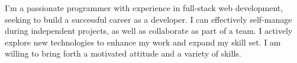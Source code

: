 

\begin{cvparagraph}

I'm a passionate programmer with experience in full-stack web development, seeking to build a successful career as a developer. I can effectively self-manage during independent projects, as well as collaborate as part of a team. I actively explore new technologies to enhance my work and expand my skill set. I am willing to bring forth a motivated attitude and a variety of skills.
\end{cvparagraph}